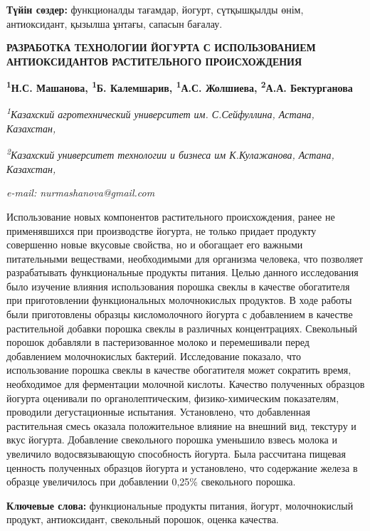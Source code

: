 {\bfseries Түйін сөздер:} функционалды тағамдар, йогурт, сүтқышқылды өнім,
антиоксидант, қызылша ұнтағы, сапасын бағалау.

\begin{articleheader}
{\bfseries РАЗРАБОТКА ТЕХНОЛОГИИ ЙОГУРТА С ИСПОЛЬЗОВАНИЕМ АНТИОКСИДАНТОВ РАСТИТЕЛЬНОГО ПРОИСХОЖДЕНИЯ}

{\bfseries
\textsuperscript{1}Н.С. Машанова\textsuperscript{\envelope },
\textsuperscript{1}Б. Калемшарив,
\textsuperscript{1}А.С. Жолшиева,
\textsuperscript{2}А.А. Бектурганова}
\end{articleheader}

\begin{affiliation}
\emph{\textsuperscript{1}Казахский агротехнический университет им. С.Сейфуллина, Астана, Казахстан,}

\emph{\textsuperscript{2}Казахский университет технологии и бизнеса им К.Кулажанова, Астана, Казахстан,}

\emph{e-mail: nurmashanova@gmail.com}
\end{affiliation}

Использование новых компонентов растительного происхождения, ранее не
применявшихся при производстве йогурта, не только придает продукту
совершенно новые вкусовые свойства, но и обогащает его важными
питательными веществами, необходимыми для организма человека, что
позволяет разрабатывать функциональные продукты питания. Целью данного
исследования было изучение влияния использования порошка свеклы в
качестве обогатителя при приготовлении функциональных молочнокислых
продуктов. В ходе работы были приготовлены образцы кисломолочного
йогурта с добавлением в качестве растительной добавки порошка свеклы в
различных концентрациях. Свекольный порошок добавляли в пастеризованное
молоко и перемешивали перед добавлением молочнокислых бактерий.
Исследование показало, что использование порошка свеклы в качестве
обогатителя может сократить время, необходимое для ферментации молочной
кислоты. Качество полученных образцов йогурта оценивали по
органолептическим, физико-химическим показателям, проводили
дегустационные испытания. Установлено, что добавленная растительная
смесь оказала положительное влияние на внешний вид, текстуру и вкус
йогурта. Добавление свекольного порошка уменьшило взвесь молока и
увеличило водосвязывающую способность йогурта. Была рассчитана пищевая
ценность полученных образцов йогурта и установлено, что содержание
железа в образце увеличилось при добавлении 0,25\% свекольного порошка.

{\bfseries Ключевые слова:} функциональные продукты питания, йогурт,
молочнокислый продукт, антиоксидант, свекольный порошок, оценка
качества.

